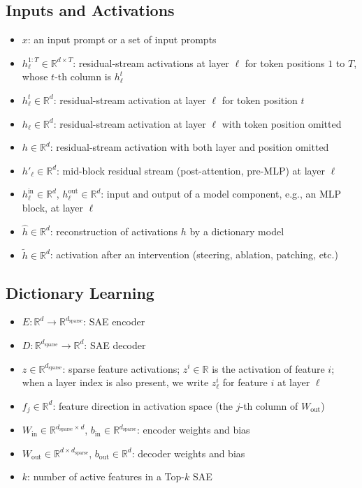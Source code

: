 \subsection{Inputs and Activations}
\begin{itemize}
    \item $x$: an input prompt or a set of input prompts
    \item $h^{1:T}_\ell \in \mathbb{R}^{d\times T}$: residual-stream activations at layer $\ell$ for token positions $1$ to $T$, whose $t$-th column is $h^t_\ell$
    \item $h_\ell^t \in \mathbb{R}^{d}$: residual-stream activation at layer $\ell$ for token position $t$
    \item $h_\ell \in \mathbb{R}^{d}$: residual-stream activation at layer $\ell$ with token position omitted
    \item $h \in \mathbb{R}^{d}$: residual-stream activation with both layer and position omitted
    \item $h'_\ell \in \mathbb{R}^{d}$: mid-block residual stream (post-attention,
          pre-MLP) at layer $\ell$
    \item $h_\ell^{\text{in}} \in \mathbb{R}^{d}$, $h_\ell^{\text{out}} \in \mathbb{R}^{d}$:
          input and output of a model component, e.g., an MLP block, at layer $\ell$
    \item $\hat{h} \in \mathbb{R}^{d}$: reconstruction of activations $h$ by a dictionary model
    \item $\tilde{h} \in \mathbb{R}^{d}$: activation after an intervention
          (steering, ablation, patching, etc.)
\end{itemize}

\subsection{Dictionary Learning}
\begin{itemize}
    \item $E : \mathbb{R}^{d} \to \mathbb{R}^{d_{\text{sparse}}}$: SAE encoder
    \item $D : \mathbb{R}^{d_{\text{sparse}}} \to \mathbb{R}^{d}$: SAE decoder
    \item $z \in \mathbb{R}^{d_{\text{sparse}}}$: sparse feature activations; $z^i \in \mathbb{R}$ is the activation of feature $i$; when a layer index is also present, we write $z_\ell^i$ for feature $i$ at layer $\ell$
    \item $f_j \in \mathbb{R}^{d}$: feature direction in activation space
          (the $j$-th column of $W_{\text{out}}$)
    \item $W_{\text{in}} \in \mathbb{R}^{d_{\text{sparse}} \times d}$,
          $b_{\text{in}} \in \mathbb{R}^{d_{\text{sparse}}}$: encoder weights and bias
    \item $W_{\text{out}} \in \mathbb{R}^{d \times d_{\text{sparse}}}$,
          $b_{\text{out}} \in \mathbb{R}^{d}$: decoder weights and bias
    \item $k$: number of active features in a Top-$k$ SAE
\end{itemize}

